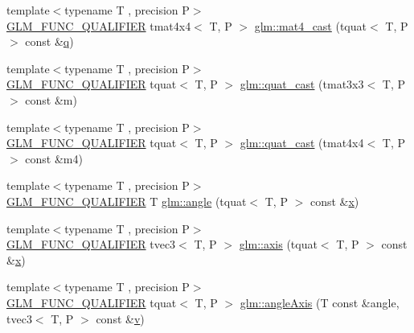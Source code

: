 \begin{DoxyCompactItemize}
\item 
{\footnotesize template$<$typename T , precision P$>$ }\\\mbox{\hyperlink{setup_8hpp_a33fdea6f91c5f834105f7415e2a64407}{G\+L\+M\+\_\+\+F\+U\+N\+C\+\_\+\+Q\+U\+A\+L\+I\+F\+I\+ER}} tmat4x4$<$ T, P $>$ \mbox{\hyperlink{group__gtc__quaternion_ga14bb2ddf028c91542763eb6f2bba47ef}{glm\+::mat4\+\_\+cast}} (tquat$<$ T, P $>$ const \&\mbox{\hyperlink{glad_8h_a514729309336df22bcc8eda979d6ced4}{q}})
\item 
{\footnotesize template$<$typename T , precision P$>$ }\\\mbox{\hyperlink{setup_8hpp_a33fdea6f91c5f834105f7415e2a64407}{G\+L\+M\+\_\+\+F\+U\+N\+C\+\_\+\+Q\+U\+A\+L\+I\+F\+I\+ER}} tquat$<$ T, P $>$ \mbox{\hyperlink{group__gtc__quaternion_ga950f8acff3e33bbda77895a3dcb7e5ce}{glm\+::quat\+\_\+cast}} (tmat3x3$<$ T, P $>$ const \&m)
\item 
{\footnotesize template$<$typename T , precision P$>$ }\\\mbox{\hyperlink{setup_8hpp_a33fdea6f91c5f834105f7415e2a64407}{G\+L\+M\+\_\+\+F\+U\+N\+C\+\_\+\+Q\+U\+A\+L\+I\+F\+I\+ER}} tquat$<$ T, P $>$ \mbox{\hyperlink{group__gtc__quaternion_ga3e4615e9884dd0f41f5617b9848a5d9c}{glm\+::quat\+\_\+cast}} (tmat4x4$<$ T, P $>$ const \&m4)
\item 
{\footnotesize template$<$typename T , precision P$>$ }\\\mbox{\hyperlink{setup_8hpp_a33fdea6f91c5f834105f7415e2a64407}{G\+L\+M\+\_\+\+F\+U\+N\+C\+\_\+\+Q\+U\+A\+L\+I\+F\+I\+ER}} T \mbox{\hyperlink{group__gtc__quaternion_gad4a4448baedb198b2b1e7880d2544dc9}{glm\+::angle}} (tquat$<$ T, P $>$ const \&\mbox{\hyperlink{glad_8h_a92d0386e5c19fb81ea88c9f99644ab1d}{x}})
\item 
{\footnotesize template$<$typename T , precision P$>$ }\\\mbox{\hyperlink{setup_8hpp_a33fdea6f91c5f834105f7415e2a64407}{G\+L\+M\+\_\+\+F\+U\+N\+C\+\_\+\+Q\+U\+A\+L\+I\+F\+I\+ER}} tvec3$<$ T, P $>$ \mbox{\hyperlink{group__gtc__quaternion_ga0b3e87a13b2708154b72259e50789a19}{glm\+::axis}} (tquat$<$ T, P $>$ const \&\mbox{\hyperlink{glad_8h_a92d0386e5c19fb81ea88c9f99644ab1d}{x}})
\item 
{\footnotesize template$<$typename T , precision P$>$ }\\\mbox{\hyperlink{setup_8hpp_a33fdea6f91c5f834105f7415e2a64407}{G\+L\+M\+\_\+\+F\+U\+N\+C\+\_\+\+Q\+U\+A\+L\+I\+F\+I\+ER}} tquat$<$ T, P $>$ \mbox{\hyperlink{group__gtc__quaternion_ga37ae19405f1ccf766f27e4fcd035d859}{glm\+::angle\+Axis}} (T const \&angle, tvec3$<$ T, P $>$ const \&\mbox{\hyperlink{glad_8h_a14cfbe2fc2234f5504618905b69d1e06}{v}})

\end{DoxyCompactItemize}
